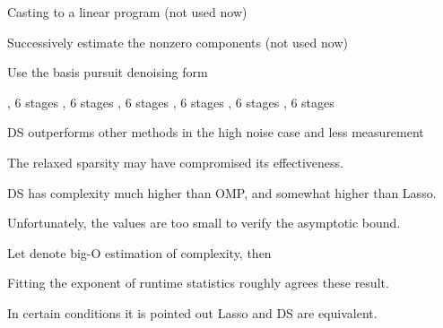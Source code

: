 {
\I Casting to a linear program (not used now)

\I Successively estimate the nonzero components (not used now)

\I Use the basis pursuit denoising form

}
{
\I {}, 6 stages
\blank [big]
}
{
\I {}, 6 stages
\blank [big]
}
{
\I {}, 6 stages
\blank [big]
}
{
\I {}, 6 stages
\blank [big]
}
{
\I {}, 6 stages
\blank [big]
}
{
\I {}, 6 stages
\blank [big]
}
{
\I DS outperforms other methods in the high noise case and less measurement

\I The relaxed sparsity may have compromised its effectiveness.

\I DS has complexity much higher than OMP, and somewhat higher than Lasso.

\I Unfortunately, the values are too small to verify the asymptotic bound.
}
{
\I Let  denote big-O estimation of complexity, then

\I Fitting the exponent of runtime statistics roughly agrees these result.

\I In certain conditions it is pointed out Lasso and DS are equivalent.
}


